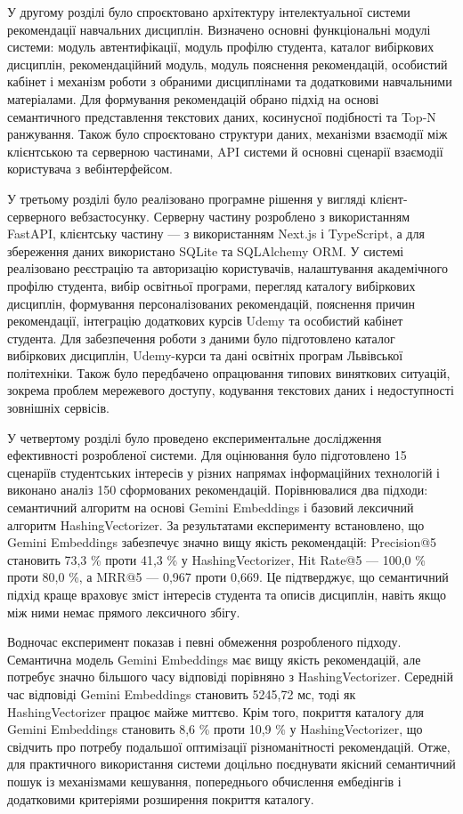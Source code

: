 \documentclass[
]{article}
\begin{document}
У другому розділі було спроєктовано архітектуру інтелектуальної системи
рекомендації навчальних дисциплін. Визначено основні функціональні
модулі системи: модуль автентифікації, модуль профілю студента, каталог
вибіркових дисциплін, рекомендаційний модуль, модуль пояснення
рекомендацій, особистий кабінет і механізм роботи з обраними
дисциплінами та додатковими навчальними матеріалами. Для формування
рекомендацій обрано підхід на основі семантичного представлення
текстових даних, косинусної подібності та Top-N ранжування. Також було
спроєктовано структури даних, механізми взаємодії між клієнтською та
серверною частинами, API системи й основні сценарії взаємодії
користувача з вебінтерфейсом.

У третьому розділі було реалізовано програмне рішення у вигляді
клієнт-серверного вебзастосунку. Серверну частину розроблено з
використанням FastAPI, клієнтську частину --- з використанням Next.js і
TypeScript, а для збереження даних використано SQLite та SQLAlchemy ORM.
У системі реалізовано реєстрацію та авторизацію користувачів,
налаштування академічного профілю студента, вибір освітньої програми,
перегляд каталогу вибіркових дисциплін, формування персоналізованих
рекомендацій, пояснення причин рекомендації, інтеграцію додаткових
курсів Udemy та особистий кабінет студента. Для забезпечення роботи з
даними було підготовлено каталог вибіркових дисциплін, Udemy-курси та
дані освітніх програм Львівської політехніки. Також було передбачено
опрацювання типових виняткових ситуацій, зокрема проблем мережевого
доступу, кодування текстових даних і недоступності зовнішніх сервісів.

У четвертому розділі було проведено експериментальне дослідження
ефективності розробленої системи. Для оцінювання було підготовлено 15
сценаріїв студентських інтересів у різних напрямах інформаційних
технологій і виконано аналіз 150 сформованих рекомендацій. Порівнювалися
два підходи: семантичний алгоритм на основі Gemini Embeddings і базовий
лексичний алгоритм HashingVectorizer. За результатами експерименту
встановлено, що Gemini Embeddings забезпечує значно вищу якість
рекомендацій: Precision@5 становить 73,3 \% проти 41,3 \% у
HashingVectorizer, Hit Rate@5 --- 100,0 \% проти 80,0 \%, а MRR@5 ---
0,967 проти 0,669. Це підтверджує, що семантичний підхід краще враховує
зміст інтересів студента та описів дисциплін, навіть якщо між ними немає
прямого лексичного збігу.

Водночас експеримент показав і певні обмеження розробленого підходу.
Семантична модель Gemini Embeddings має вищу якість рекомендацій, але
потребує значно більшого часу відповіді порівняно з HashingVectorizer.
Середній час відповіді Gemini Embeddings становить 5245,72 мс, тоді як
HashingVectorizer працює майже миттєво. Крім того, покриття каталогу для
Gemini Embeddings становить 8,6 \% проти 10,9 \% у HashingVectorizer, що
свідчить про потребу подальшої оптимізації різноманітності рекомендацій.
Отже, для практичного використання системи доцільно поєднувати якісний
семантичний пошук із механізмами кешування, попереднього обчислення
ембедінгів і додатковими критеріями розширення покриття каталогу.
\end{document}
